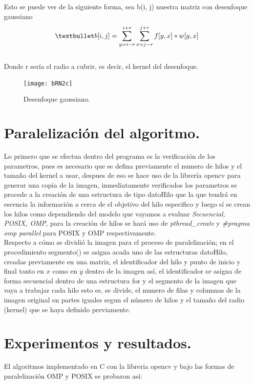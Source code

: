 \documentclass{IEEEtran}
\begin{document}
Esto se puede ver de la siguiente forma, sea b(i, j) nuestra matriz con desenfoque gaussiano
\\
\begin{equation}
\centering
•b[i, j] = \sum\limits_{y = i - r}^{i + r} \sum\limits_{x = j - r}^{j + r} f[y, x] * w[y, x]
\end{equation}
\\
Donde r sería el radio a cubrir, es decir, el kernel del desenfoque.

\begin{figure}[htb]
\centering
\texttt{[image: bRN2c]}
\caption{Desenfoque gaussiano.} \label{fig:fig1}
\end{figure}

\section{Paralelización del algoritmo.}

Lo primero que se efectua dentro del programa es la verificación de los parametros, pues es necesario que se defina previamente el numero de hilos y el tamaño del kernel a usar, despues de eso se hace uso de la librería opencv para generar una copia de la imagen, inmediatamente  verificados los parametros se procede a la creación de una estructura de tipo datoHilo que la que tendrá en escencia la información a cerca de el objetivo del hilo especifico y luego sí se crean los hilos como dependiendo del modelo que vayamos a evaluar \textit{Secuencial, POSIX, OMP}, para la creación de hilos se hará uso de  \textit{pthread\_create} y \textit{\#pragma omp parallel} para POSIX y OMP respectivamente.
\\

Respecto a cómo se dividió la imagen para el proceso de paralelización; en el procedimiento segmento() se asigna acada uno de las estructuras datoHilo, creadas previamente en una matriz, el identificador del hilo y punto de inicio y final tanto en $x$ como en $y$ dentro de la imagen así, el identificador se asigna de forma secuencial dentro de una estructura for y el segmento de la imagen que vaya a trabajar cada hilo esto es, se divide, el numero de filas y columnas de la imagen original en partes iguales segun el número de hilos y el tamaño del radio (kernel) que se haya definido previamente.


\section{Experimentos y resultados.}
El algoritmos implementado en C con la libreria opencv y bajo las formas de paralelización OMP y POSIX se probaron así:
\end{document}
